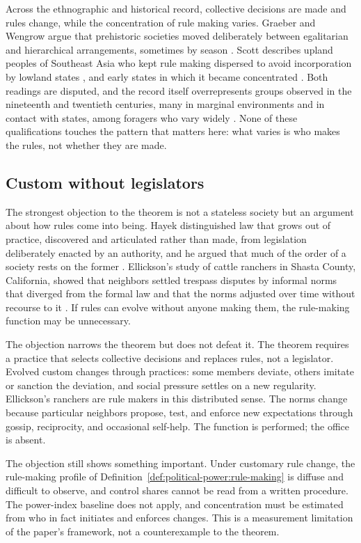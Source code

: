 \documentclass[11pt,letterpaper]{article}
\theoremstyle{definition}
\theoremstyle{remark}
\begin{document}
Across the ethnographic and historical record, collective decisions are made and rules change, while the concentration of rule making varies. Graeber and Wengrow argue that prehistoric societies moved deliberately between egalitarian and hierarchical arrangements, sometimes by season \citep{graeber2021}. Scott describes upland peoples of Southeast Asia who kept rule making dispersed to avoid incorporation by lowland states \citep{scott2009}, and early states in which it became concentrated \citep{scott2017}. Both readings are disputed, and the record itself overrepresents groups observed in the nineteenth and twentieth centuries, many in marginal environments and in contact with states, among foragers who vary widely \citep{kelly1995}. None of these qualifications touches the pattern that matters here: what varies is who makes the rules, not whether they are made.

\subsection{Custom without legislators}

The strongest objection to the theorem is not a stateless society but an argument about how rules come into being. Hayek distinguished law that grows out of practice, discovered and articulated rather than made, from legislation deliberately enacted by an authority, and he argued that much of the order of a society rests on the former \citep{hayek1973}. Ellickson's study of cattle ranchers in Shasta County, California, showed that neighbors settled trespass disputes by informal norms that diverged from the formal law and that the norms adjusted over time without recourse to it \citep{ellickson1991}. If rules can evolve without anyone making them, the rule-making function may be unnecessary.

The objection narrows the theorem but does not defeat it. The theorem requires a practice that selects collective decisions and replaces rules, not a legislator. Evolved custom changes through practices: some members deviate, others imitate or sanction the deviation, and social pressure settles on a new regularity. Ellickson's ranchers are rule makers in this distributed sense. The norms change because particular neighbors propose, test, and enforce new expectations through gossip, reciprocity, and occasional self-help. The function is performed; the office is absent.

The objection still shows something important. Under customary rule change, the rule-making profile of Definition~\ref{def:political-power:rule-making} is diffuse and difficult to observe, and control shares cannot be read from a written procedure. The power-index baseline does not apply, and concentration must be estimated from who in fact initiates and enforces changes. This is a measurement limitation of the paper's framework, not a counterexample to the theorem.
\end{document}
